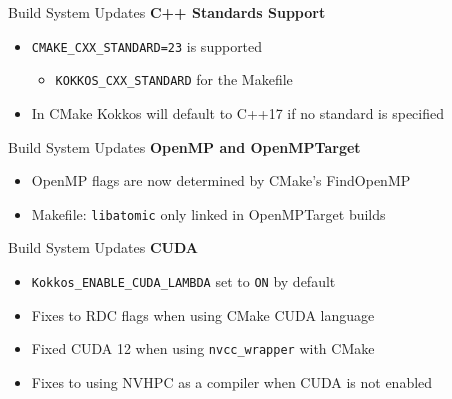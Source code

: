 



\begin{frame}[fragile]{Build System Updates}
\textbf{C++ Standards Support}
\begin{itemize}
  \item \texttt{CMAKE\_CXX\_STANDARD=23} is supported
  \begin{itemize}
    \item \texttt{KOKKOS\_CXX\_STANDARD} for the Makefile
  \end{itemize}
  \item In CMake Kokkos will default to C++17 if no standard is specified
\end{itemize}
\end{frame}



\begin{frame}[fragile]{Build System Updates}
\textbf{OpenMP and OpenMPTarget}
\begin{itemize}
  \item OpenMP flags are now determined by CMake's FindOpenMP
  \item Makefile: \texttt{libatomic} only linked in OpenMPTarget builds
\end{itemize}
\end{frame}



\begin{frame}[fragile]{Build System Updates}
\textbf{CUDA}
\begin{itemize}
  \item \texttt{Kokkos\_ENABLE\_CUDA\_LAMBDA} set to \texttt{ON} by default
  \item Fixes to RDC flags when using CMake CUDA language
  \item Fixed CUDA 12 when using \texttt{nvcc\_wrapper} with CMake
  \item Fixes to using NVHPC as a compiler when CUDA is not enabled
\end{itemize}
\end{frame}



